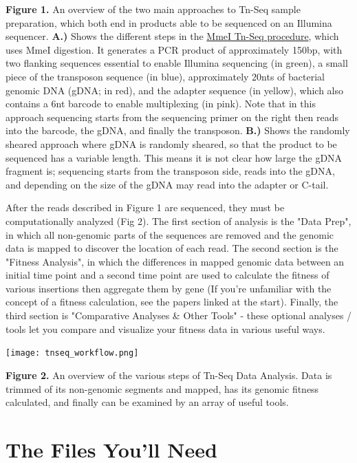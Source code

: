 \documentclass{article}
\begin{document}
\noindent
\textbf{Figure 1.} An overview of the two main approaches to Tn-Seq sample preparation, which both end in products able to be sequenced on an Illumina sequencer. \textbf{A.)} Shows the different steps in the \href{http://www.nature.com/nmeth/journal/v6/n10/abs/nmeth.1377.html}{MmeI Tn-Seq procedure}, which uses MmeI digestion. It generates a PCR product of approximately 150bp, with two flanking sequences  essential to enable Illumina sequencing (in green), a small piece of the transposon sequence (in blue), approximately 20nts of bacterial genomic DNA (gDNA; in red), and the adapter sequence (in yellow), which also contains a 6nt barcode to enable multiplexing (in pink). Note that in this approach sequencing starts from the sequencing primer on the right then reads into the barcode, the gDNA, and finally the transposon. \textbf{B.)} Shows the randomly sheared approach where gDNA is randomly sheared,  so that the product to be sequenced has a variable length. This means it is not clear how large the gDNA fragment is; sequencing starts from the transposon side, reads into the gDNA, and depending on the size of the gDNA may read into the adapter or C-tail.

\vspace{5 mm}

\noindent
After the reads described in Figure 1 are sequenced, they must be computationally analyzed (Fig 2). The first section of analysis is the "Data Prep", in which all non-genomic parts of the sequences are removed and the genomic data is mapped to discover the location of each read. The second section is the "Fitness Analysis", in which the differences in mapped genomic data between an initial time point and a second time point are used to calculate the fitness of various insertions then aggregate them by gene (If you're unfamiliar with the concept of a fitness calculation, see the papers linked at the start). Finally, the third section is "Comparative Analyses \& Other Tools" - these optional analyses / tools let you compare and visualize your fitness data in various useful ways.

\noindent
\texttt{[image: tnseq\_workflow.png]}

\noindent
\textbf{Figure 2.} An overview of the various steps of Tn-Seq Data Analysis. Data is trimmed of its non-genomic segments and mapped, has its genomic fitness calculated, and finally can be examined by an array of useful tools.

\newpage
\section{The Files You'll Need}
\label{sec:files}
\end{document}
